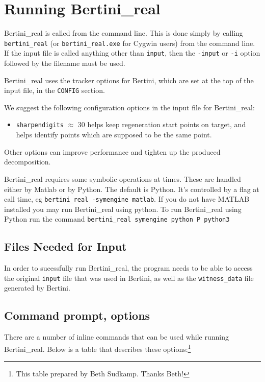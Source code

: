 
\section{Running Bertini\_real}
\label{sec:running_br}

Bertini\_real is called from the command line.   This is done simply by calling \texttt{bertini\_real} (or \texttt{bertini\_real.exe} for Cygwin users) from the command line. If the input file is called anything other than \texttt{input}, then the \texttt{-input} or \texttt{-i} option followed by the filename must be used.


Bertini\_real uses the tracker options for Bertini, which are set at the top of the input file, in the {\tt CONFIG} section.

We suggest the following configuration options in the input file for Bertini\_real:
\begin{itemize}
\item {\tt sharpendigits} $\approx$ 30
helps keep regeneration start points on target, and helps identify points which are supposed to be the same point.
\end{itemize}
Other options can improve performance and tighten up the produced decomposition.


Bertini\_real requires some symbolic operations at times.  These are handled either by Matlab or by Python.  The default is Python.  It's controlled by a flag at call time, eg \verb|bertini_real -symengine matlab|.  
If you do not have MATLAB installed you may run Bertini\_real using python. To run Bertini\_real using Python run the command  \texttt{bertini\_real \-symengine python \-P python3}


\subsection{Files Needed for Input}
In order to sucessfully run Bertini\_real, the program needs to be able to access the original \texttt{input} file that was used in Bertini, as well as the \texttt{witness\_data} file generated by Bertini.


\subsection{Command prompt, options}
There are a number of inline commands that can be used while running Bertini\_real. Below is a table that describes these options:\footnote{This table prepared by Beth Sudkamp.  Thanks Beth!}

